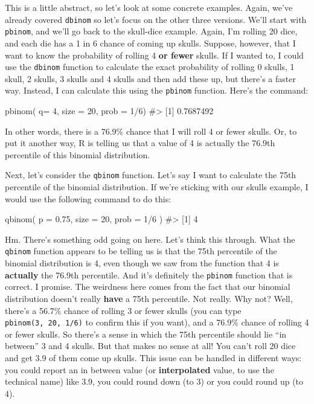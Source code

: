 \documentclass[
  letterpaper,
  DIV=11,
  numbers=noendperiod]{scrreprt}
\newenvironment{Shaded}{\begin{snugshade}}{\end{snugshade}}
\newcommand{\AttributeTok}[1]{\textcolor[rgb]{0.40,0.45,0.13}{#1}}
\newcommand{\CommentTok}[1]{\textcolor[rgb]{0.37,0.37,0.37}{#1}}
\newcommand{\DecValTok}[1]{\textcolor[rgb]{0.68,0.00,0.00}{#1}}
\newcommand{\FloatTok}[1]{\textcolor[rgb]{0.68,0.00,0.00}{#1}}
\newcommand{\FunctionTok}[1]{\textcolor[rgb]{0.28,0.35,0.67}{#1}}
\newcommand{\NormalTok}[1]{\textcolor[rgb]{0.00,0.23,0.31}{#1}}
\newcommand{\SpecialCharTok}[1]{\textcolor[rgb]{0.37,0.37,0.37}{#1}}
\begin{document}
This is a little abstract, so let's look at some concrete examples.
Again, we've already covered \texttt{dbinom} so let's focus on the other
three versions. We'll start with \texttt{pbinom}, and we'll go back to
the skull-dice example. Again, I'm rolling 20 dice, and each die has a 1
in 6 chance of coming up skulls. Suppose, however, that I want to know
the probability of rolling 4 \textbf{or fewer} skulls. If I wanted to, I
could use the \texttt{dbinom} function to calculate the exact
probability of rolling 0 skulls, 1 skull, 2 skulls, 3 skulls and 4
skulls and then add these up, but there's a faster way. Instead, I can
calculate this using the \texttt{pbinom} function. Here's the command:

\begin{Shaded}
\begin{Highlighting}[]
\FunctionTok{pbinom}\NormalTok{( }\AttributeTok{q=} \DecValTok{4}\NormalTok{, }\AttributeTok{size =} \DecValTok{20}\NormalTok{, }\AttributeTok{prob =} \DecValTok{1}\SpecialCharTok{/}\DecValTok{6}\NormalTok{)}
\CommentTok{\#\textgreater{} [1] 0.7687492}
\end{Highlighting}
\end{Shaded}

In other words, there is a 76.9\% chance that I will roll 4 or fewer
skulls. Or, to put it another way, R is telling us that a value of 4 is
actually the 76.9th percentile of this binomial distribution.

Next, let's consider the \texttt{qbinom} function. Let's say I want to
calculate the 75th percentile of the binomial distribution. If we're
sticking with our skulls example, I would use the following command to
do this:

\begin{Shaded}
\begin{Highlighting}[]
\FunctionTok{qbinom}\NormalTok{( }\AttributeTok{p =} \FloatTok{0.75}\NormalTok{, }\AttributeTok{size =} \DecValTok{20}\NormalTok{, }\AttributeTok{prob =} \DecValTok{1}\SpecialCharTok{/}\DecValTok{6}\NormalTok{ )}
\CommentTok{\#\textgreater{} [1] 4}
\end{Highlighting}
\end{Shaded}

Hm. There's something odd going on here. Let's think this through. What
the \texttt{qbinom} function appears to be telling us is that the 75th
percentile of the binomial distribution is 4, even though we saw from
the function that 4 is \textbf{actually} the 76.9th percentile. And it's
definitely the \texttt{pbinom} function that is correct. I promise. The
weirdness here comes from the fact that our binomial distribution
doesn't really \textbf{have} a 75th percentile. Not really. Why not?
Well, there's a 56.7\% chance of rolling 3 or fewer skulls (you can type
\texttt{pbinom(3,\ 20,\ 1/6)} to confirm this if you want), and a 76.9\%
chance of rolling 4 or fewer skulls. So there's a sense in which the
75th percentile should lie ``in between'' 3 and 4 skulls. But that makes
no sense at all! You can't roll 20 dice and get 3.9 of them come up
skulls. This issue can be handled in different ways: you could report an
in between value (or \textbf{interpolated} value, to use the technical
name) like 3.9, you could round down (to 3) or you could round up (to
4).
\end{document}
